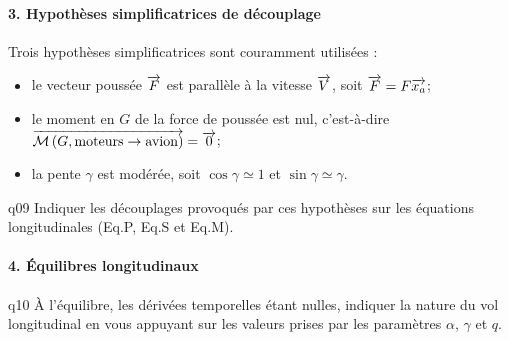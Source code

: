 \begin{multicols}{2}
  
\paragraph*{3. Hypothèses simplificatrices de découplage}
  
Trois hypothèses simplificatrices sont couramment utilisées : 
\begin{itemize}
\item le vecteur poussée $\overrightarrow{F}$ est parallèle à la vitesse $\overrightarrow{V}$, soit $\overrightarrow{F}=F\overrightarrow{x_a}$;
\item le moment en $G$ de la force de poussée est nul, c'est-à-dire $\overrightarrow{\mathcal{M}\left( {G}, {\text{moteurs}} \rightarrow {\text{avion}}\right)}=\overrightarrow{0}$;
\item la pente $\gamma$ est modérée, soit $\cos \gamma \simeq 1$ et $\sin \gamma \simeq \gamma$.  
\end{itemize}

{\begin{question}{q09}
Indiquer les découplages provoqués par ces hypothèses sur les équations longitudinales
(Eq.P, Eq.S et Eq.M).
\ifprof
\begin{corrige}
\end{corrige}
\else
\fi
\begin{reponses}
\end{reponses} \end{question}}
  

\paragraph*{4. Équilibres longitudinaux}


{\begin{question}{q10}
À l’équilibre, les dérivées temporelles étant nulles, indiquer la nature du vol longitudinal en
vous appuyant sur les valeurs prises par les paramètres $\alpha$, $\gamma$ et $q$.
\ifprof
\begin{corrige}
\end{corrige}
\else
\fi
\begin{reponses}
\end{reponses} \end{question}}


\end{multicols}
